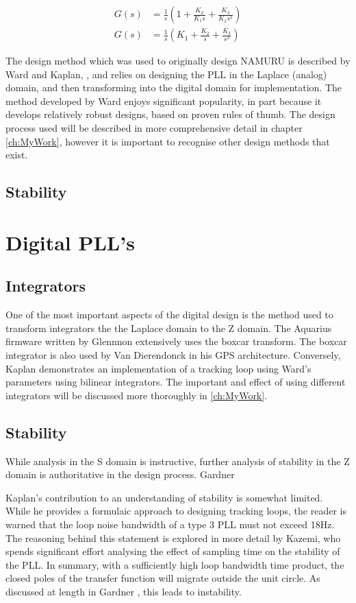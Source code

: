 	
	\begin{align}
	G(s) &= \frac{1}{s}(1 + \frac{K_2}{K_1s} + \frac{K_3}{K_1s^2})\\
	G(s) &= \frac{1}{s}(K_1 + \frac{K_2}{s} + \frac{K_3}{s^2})
	\label{eq:3rdOrderLoopGardner}
	\end{align}

	The design method which was used to originally design \ac{NAMURU} is described by Ward and Kaplan, \cite{Ward,Kaplan}, and relies on designing the PLL in the Laplace (analog) domain, and then transforming into the digital domain for implementation. The method developed by Ward enjoys significant popularity, in part because it develops relatively robust designs, based on proven rules of thumb. The design process used will be described in more comprehensive detail in chapter \ref{ch:MyWork}, however it is important to recognise other design methods that exist. 
	
	
	\subsection{Stability}

\clearpage

\section{Digital PLL's}
	\subsection{Integrators}
	One of the most important aspects of the digital design is the method used to transform integrators the the Laplace domain to the Z domain. The Aquarius firmware\cite{FirmwareCode} written by Glennnon extensively uses the boxcar transform. The boxcar integrator is also used by Van Dierendonck  \cite{Spilker} in his GPS architecture. Conversely, Kaplan \cite{Kaplan} demonstrates an implementation of a tracking loop using Ward's parameters using bilinear integrators. The important and effect of using different integrators will be discussed more thoroughly in \ref{ch:MyWork}.
	
	\subsection{Stability}
	    While analysis in the S domain is instructive, further analysis of stability in the Z domain is authoritative in the design process. Gardner 
	    
	    Kaplan's contribution to an understanding of stability is somewhat limited. While he provides a formulaic approach to designing tracking loops, the reader is warned that the loop noise bandwidth of a type 3 PLL must not exceed 18Hz\cite{Kaplan}. The reasoning behind this statement is explored in more detail by Kazemi, who spends significant effort analysing the effect of sampling time on the stability of the PLL. In summary, with a sufficiently high loop bandwidth time product, the closed poles of the transfer function will migrate outside the unit circle. As discussed at length in Gardner \cite{Gardner}, this leads to instability. 
	    